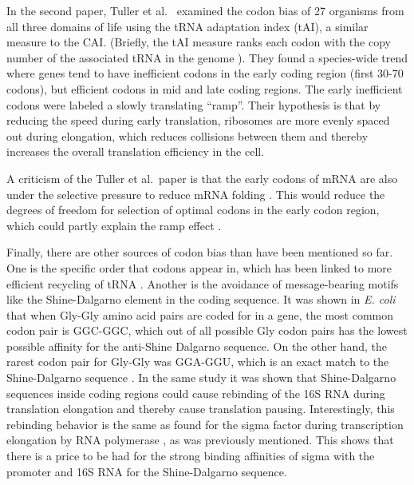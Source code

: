 In the second paper, Tuller et al.\ \cite{tuller_evolutionarily_2010} examined
the codon bias of 27 organisms from all three domains of life using the tRNA
adaptation index (tAI), a similar measure to the CAI. (Briefly, the tAI measure
ranks each codon with the copy number of the associated tRNA in the genome
\cite{tuller_evolutionarily_2010}). They found a species-wide trend where genes
tend to have inefficient codons in the early coding region (first 30-70
codons), but efficient codons in mid and late coding regions. The early
inefficient codons were labeled a slowly translating ``ramp''. Their hypothesis
is that by reducing the speed during early translation, ribosomes are more
evenly spaced out during elongation, which reduces collisions between them and
thereby increases the overall translation efficiency in the cell.

A criticism of the Tuller et al.\ paper is that the early codons of mRNA are
also under the selective pressure to reduce mRNA folding
\cite{gu_universal_2010}. This would reduce the degrees of freedom for
selection of optimal codons in the early codon region, which could partly
explain the ramp effect \cite{plotkin_synonymous_2011}.

Finally, there are other sources of codon bias than have been mentioned so far.
One is the specific order that codons appear in, which has been linked to more
efficient recycling of tRNA \cite{cannarozzi_role_2010}. Another is the
avoidance of message-bearing motifs like the Shine-Dalgarno element in the
coding sequence. It was shown in \textit{E. coli} that when Gly-Gly amino acid
pairs are coded for in a gene, the most common codon pair is GGC-GGC, which out
of all possible Gly codon pairs has the lowest possible affinity for the
anti-Shine Dalgarno sequence. On the other hand, the rarest codon pair for
Gly-Gly was GGA-GGU, which is an exact match to the Shine-Dalgarno sequence
\cite{li_anti-shine-dalgarno_2012}. In the same study it was shown that
Shine-Dalgarno sequences inside coding regions could cause rebinding of the 16S
RNA during translation elongation and thereby cause translation pausing.
Interestingly, this rebinding behavior is the same as found for the sigma
factor during transcription elongation by RNA polymerase
\cite{mooney_sigma_2005}, as was previously mentioned. This shows that there is
a price to be had for the strong binding affinities of sigma with the promoter
and 16S RNA for the Shine-Dalgarno sequence.
